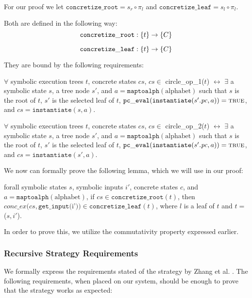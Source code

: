 For our proof we let $\mathtt{concretize\_root}=  s_r \circ \pi_l$ and $\mathtt{concretize\_leaf} =  s_l \circ \pi_l$.

Both are defined in the following way: 
$$\mathtt{concretize\_root} : \{ t \} \rightarrow \{C\}$$

$$\mathtt{concretize\_leaf} : \{ t \} \rightarrow \{C\}$$

They are bound by the following requirements:

\begin{definition}
$\forall$ symbolic execution trees $t$,  concrete states $cs$,
$cs \in$ circle\_op\_1($t$) $\leftrightarrow$ 
$\exists$ a symbolic state $s$, a tree node $s'$, and $a = \mathtt{maptoalph}(\mathrm{alphabet})$ such that
$s$ is the root of $t$, $s'$ is the selected leaf of $t$, 
$\mathtt{pc\_eval} (\mathtt{instantiate} (s'.\mathit{pc}, a)) = \mathtt{\textsc{true}}$, and 
$cs = \mathtt{instantiate}(s, a)$.
\end{definition}

\begin{definition}
$\forall$ symbolic execution trees $t$,  concrete states $cs$,
$cs \in$ circle\_op\_2($t$) $\leftrightarrow$ 
$\exists$ a symbolic state $s$, a tree node $s'$, and $a = \mathtt{maptoalph}(\mathrm{alphabet})$ such that
$s$ is the root of $t$, $s'$ is the selected leaf of $t$, 
$\mathtt{pc\_eval} (\mathtt{instantiate} (s'.\mathit{pc}, a)) = \mathtt{\textsc{true}}$, and 
$cs = \mathtt{instantiate}(s', a)$.
\end{definition}


We now can formally prove the following lemma, which we will use in our proof:
\begin{lemma} \label{cop}
forall symbolic states $s$, symbolic inputs $i'$, concrete states $c$, and $a = \mathtt{maptoalph}(\mathrm{alphabet})$,
if $cs \in \mathtt{concretize\_root}(t)$,
then 
$conc\_ex(cs, \mathtt{get\_input} ($i'$)) \in \mathtt{concretize\_leaf}(t)$,
where $l$ is a leaf of $t$ and $t = $ \symexecution($s, i'$).
\end{lemma}

In order to prove this, we utilize the commutativity property expressed earlier.


\subsubsection{Recursive Strategy Requirements}
We formally express the requirements stated of the strategy by Zhang et al. \cite{zhang2018recursive}.
The following requirements, when placed on our system, should be enough to prove that the strategy works as expected:

